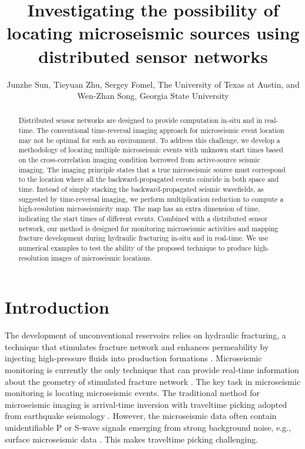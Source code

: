 
\title{Investigating the possibility of locating microseismic sources using distributed sensor networks}
\author{Junzhe Sun, Tieyuan Zhu, Sergey Fomel, The University of Texas at Austin, and Wen-Zhan Song, Georgia State University}

\maketitle


\begin{abstract}
Distributed sensor networks are designed to provide computation in-situ and in real-time. The conventional time-reversal imaging approach for microseismic event location may not be optimal for such an environment. To address this challenge, we develop a methodology of locating multiple microseismic events with unknown start times based on the cross-correlation imaging condition borrowed from active-source seismic imaging. The imaging principle states that a true microseismic source must correspond to the location where all the backward-propagated events coincide in both space and time. Instead of simply stacking the backward-propagated seismic wavefields, as suggested by time-reversal imaging, we perform multiplication reduction to compute a high-resolution microseismicity map. The map has an extra dimension of time, indicating the start times of different events. Combined with a distributed sensor network, our method is designed for monitoring microseismic activities and mapping fracture development during hydraulic fracturing in-situ and in real-time. We use numerical examples to test the ability of the proposed technique to produce high-resolution images of microseismic locations.
\end{abstract}

\section{Introduction}
The development of unconventional reservoirs relies on hydraulic fracturing, a technique that stimulates fracture network and enhances permeability by injecting high-pressure fluids into production formations \cite[]{montgomery10}. Microseismic monitoring is currently the only technique that can provide real-time information about the geometry of stimulated fracture network \cite[]{maxwellbook}. The key task in microseismic monitoring is locating microseismic events. The traditional method for microseismic imaging is arrival-time inversion with traveltime picking adopted from earthquake seismology \cite[]{gibowicz13}. However, the microseismic data often contain unidentifiable P or S-wave signals emerging from strong background noise, e.g., surface microseismic data \cite[]{duncan10}. This makes traveltime picking challenging.

